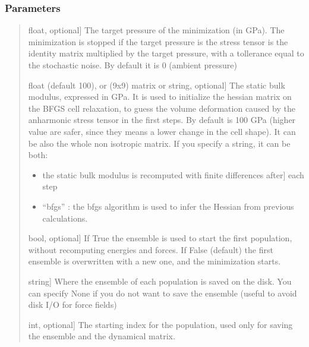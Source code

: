 \documentclass[a4paper,11pt,english]{sphinxmanual}
\begin{document}
\begin{fulllineitems}
\begin{fulllineitems}
\subsubsection{Parameters}
\label{\detokenize{apireference:id42}}\begin{quote}
\begin{description}
\sphinxlineitem{target\_press}{[}float, optional{]}
\sphinxAtStartPar
The target pressure of the minimization (in GPa). The minimization is stopped if the
target pressure is the stress tensor is the identity matrix multiplied by the
target pressure, with a tollerance equal to the stochastic noise. By default
it is 0 (ambient pressure)

\sphinxlineitem{static\_bulk\_modulus}{[}float (default 100), or (9x9) matrix or string, optional{]}
\sphinxAtStartPar
The static bulk modulus, expressed in GPa. It is used to initialize the
hessian matrix on the BFGS cell relaxation, to guess the volume deformation caused
by the anharmonic stress tensor in the first steps. By default is 100 GPa (higher value
are safer, since they means a lower change in the cell shape).
It can be also the whole non isotropic matrix. If you specify a string, it
can be both:
\begin{itemize}
\item {} \begin{description}
\sphinxlineitem{“recalc”}{[}the static bulk modulus is recomputed with finite differences after{]}
\sphinxAtStartPar
each step

\end{description}

\item {} 
\sphinxAtStartPar
“bfgs” : the bfgs algorithm is used to infer the Hessian from previous calculations.

\end{itemize}

\sphinxlineitem{restart\_from\_ens}{[}bool, optional{]}
\sphinxAtStartPar
If True the ensemble is used to start the first population, without recomputing
energies and forces. If False (default) the first ensemble is overwritten with
a new one, and the minimization starts.

\sphinxlineitem{ensemble\_loc}{[}string{]}
\sphinxAtStartPar
Where the ensemble of each population is saved on the disk. You can specify None
if you do not want to save the ensemble (useful to avoid disk I/O for force fields)

\sphinxlineitem{start\_pop}{[}int, optional{]}
\sphinxAtStartPar
The starting index for the population, used only for saving the ensemble and the dynamical
matrix.


\end{description}
\end{quote}
\end{fulllineitems}
\end{fulllineitems}
\end{document}
